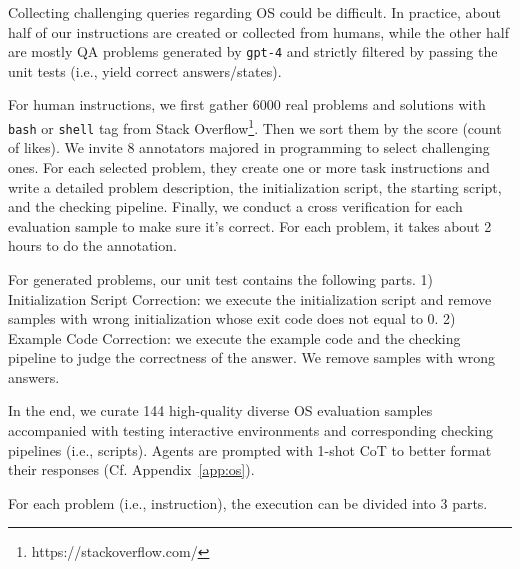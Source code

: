 Collecting challenging queries regarding OS could be difficult.
In practice, about half of our instructions are created or collected from humans, while the other half are mostly QA problems generated by \texttt{gpt-4} and strictly filtered by passing the unit tests (i.e., yield correct answers/states).

For human instructions, we first gather 6000 real problems and solutions with \texttt{bash} or \texttt{shell} tag from Stack Overflow\footnote{https://stackoverflow.com/}. Then we sort them by the score (count of likes). We invite 8 annotators majored in programming to select challenging ones. 
For each selected problem, they create one or more task instructions and write a detailed problem description, the initialization script, the starting script, and the checking pipeline. 
Finally, we conduct a cross verification for each evaluation sample to make sure it's correct. For each problem, it takes about 2 hours to do the annotation.


For generated problems, our unit test contains the following parts. 
1) Initialization Script Correction:
we execute the initialization script and remove samples with wrong initialization whose exit code does not equal to $0$.
2) Example Code Correction: we execute the example code and the checking pipeline to judge the correctness of the answer. We remove samples with wrong answers.

In the end, we curate 144 high-quality diverse OS evaluation samples accompanied with testing interactive environments and corresponding checking pipelines (i.e., scripts).
Agents are prompted with 1-shot CoT to better format their responses (Cf. Appendix~\ref{app:os}).

For each problem (i.e., instruction), the execution can be divided into 3 parts. 

